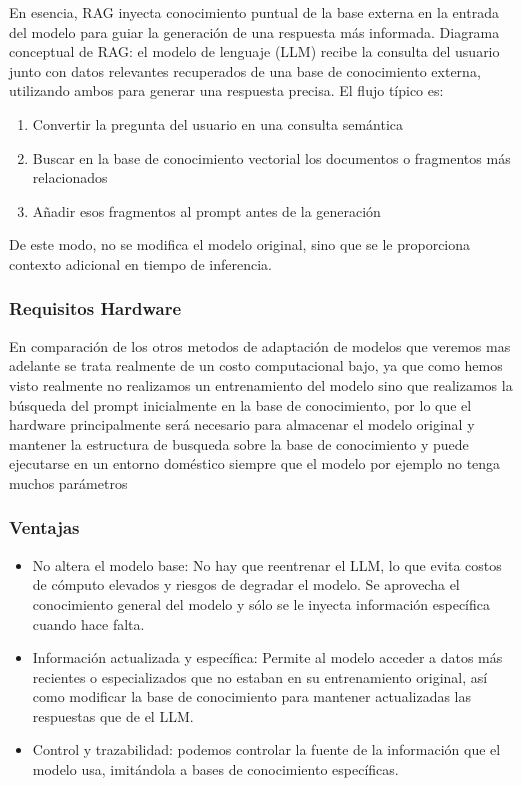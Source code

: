 En esencia, RAG inyecta conocimiento puntual de la base externa en la entrada del modelo para guiar la generación de una respuesta más informada. Diagrama conceptual de RAG: el modelo de lenguaje (LLM) recibe la consulta del usuario junto con datos relevantes recuperados de una base de conocimiento externa, utilizando ambos para generar una respuesta precisa. El flujo típico es:

\begin{enumerate}
    \item Convertir la pregunta del usuario en una consulta semántica
    \item Buscar en la base de conocimiento vectorial los documentos o fragmentos más relacionados
    \item Añadir esos fragmentos al prompt antes de la generación
\end{enumerate}

De este modo, no se modifica el modelo original, sino que se le proporciona contexto adicional en tiempo de inferencia.

\subsubsection{Requisitos Hardware}
En comparación de los otros metodos de adaptación de modelos que veremos mas adelante se trata realmente de un costo computacional bajo, ya que como hemos visto realmente no realizamos un entrenamiento del modelo sino que realizamos la búsqueda del prompt inicialmente en la base de conocimiento, por lo que el hardware principalmente será necesario para almacenar el modelo original y mantener la estructura de busqueda sobre la base de conocimiento y puede ejecutarse en un entorno doméstico siempre que el modelo por ejemplo no tenga muchos parámetros 

\subsubsection{Ventajas}

\begin{itemize}
    \item No altera el modelo base: No hay que reentrenar el LLM, lo que evita costos de cómputo elevados y riesgos de degradar el modelo. Se aprovecha el conocimiento general del modelo y sólo se le inyecta información específica cuando hace falta.

    \item Información actualizada y específica: Permite al modelo acceder a datos más recientes o especializados que no estaban en su entrenamiento original, así como modificar la base de conocimiento para mantener actualizadas las respuestas que de el LLM.

    \item Control y trazabilidad: podemos controlar la fuente de la información que el modelo usa, imitándola a bases de conocimiento específicas.
\end{itemize}

